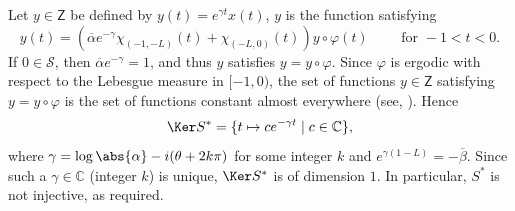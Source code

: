 Let $y \in \mathsf Z$ be defined by $y(t) = e^{\gamma t} x(t)$, \ie $y$ is the function satisfying
\begin{equation}
\label{FixedPointV}
y(t) = \left(\overline\alpha e^{-\gamma} \chi_{(-1, -L)}(t) + \chi_{(-L, 0)}(t)\right) y \circ \varphi(t) \qquad \text{ for } -1 < t < 0.
\end{equation}
If $0 \in \mathcal S$, then $\overline\alpha e^{-\gamma} = 1$, and thus $y$ satisfies $y = y \circ \varphi$. Since $\varphi$ is ergodic with respect to the Lebesgue measure in $[-1, 0)$, the set of functions $y \in \mathsf Z$ satisfying $y = y \circ \varphi$ is the set of functions constant almost everywhere (see, \eg \cite[Chap.\,II, Prop.\,2.1]{Mane1987Ergodic}). Hence
\begin{equation}
\label{EqKerS}
\Ker S^\ast = \{t \mapsto c e^{-\gamma t} \mid c \in \mathbb C\},
\end{equation}
where $\gamma = \log\abs{\alpha} - i (\theta + 2 k \pi)$ for some integer $k$ and $e^{\gamma(1 - L)} = - \overline\beta$. Since such a $\gamma \in \mathbb C$ (\ie integer $k$) is unique, $\Ker S^\ast$ is of dimension $1$. In particular, $S^\ast$ is not injective, as required.


